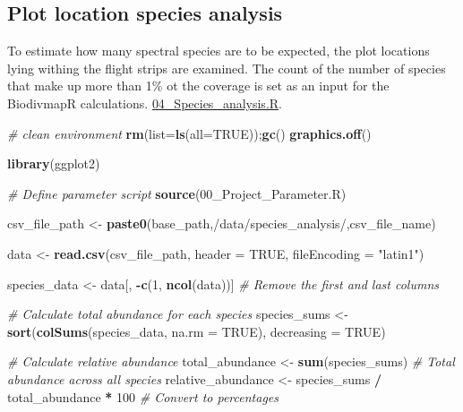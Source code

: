 \documentclass[
]{article}
\newenvironment{Shaded}{\begin{snugshade}}{\end{snugshade}}
\newcommand{\AttributeTok}[1]{\textcolor[rgb]{0.13,0.29,0.53}{#1}}
\newcommand{\CommentTok}[1]{\textcolor[rgb]{0.56,0.35,0.01}{\textit{#1}}}
\newcommand{\ConstantTok}[1]{\textcolor[rgb]{0.56,0.35,0.01}{#1}}
\newcommand{\DecValTok}[1]{\textcolor[rgb]{0.00,0.00,0.81}{#1}}
\newcommand{\FunctionTok}[1]{\textcolor[rgb]{0.13,0.29,0.53}{\textbf{#1}}}
\newcommand{\NormalTok}[1]{#1}
\newcommand{\OtherTok}[1]{\textcolor[rgb]{0.56,0.35,0.01}{#1}}
\newcommand{\SpecialCharTok}[1]{\textcolor[rgb]{0.81,0.36,0.00}{\textbf{#1}}}
\newcommand{\StringTok}[1]{\textcolor[rgb]{0.31,0.60,0.02}{#1}}
\begin{document}
\subsection{Plot location species
analysis}\label{plot-location-species-analysis}

To estimate how many spectral species are to be expected, the plot
locations lying withing the flight strips are examined. The count of the
number of species that make up more than 1\% ot the coverage is set as
an input for the BiodivmapR calculations.
\href{https://github.com/patrickangst/UWW200_Master_Thesis_public/blob/main/MasterThesisRCode/04_Species_analysis.R}{04\_Species\_analysis.R}.

\begin{Shaded}
\begin{Highlighting}[]
\CommentTok{\# clean environment}
\FunctionTok{rm}\NormalTok{(}\AttributeTok{list=}\FunctionTok{ls}\NormalTok{(}\AttributeTok{all=}\ConstantTok{TRUE}\NormalTok{));}\FunctionTok{gc}\NormalTok{()}
\FunctionTok{graphics.off}\NormalTok{()}

\FunctionTok{library}\NormalTok{(ggplot2)}

\CommentTok{\# Define parameter script}
\FunctionTok{source}\NormalTok{(}\StringTok{\textquotesingle{}00\_Project\_Parameter.R\textquotesingle{}}\NormalTok{)}

\NormalTok{csv\_file\_path }\OtherTok{\textless{}{-}} \FunctionTok{paste0}\NormalTok{(base\_path,}\StringTok{\textquotesingle{}/data/species\_analysis/\textquotesingle{}}\NormalTok{,csv\_file\_name)}

\NormalTok{data }\OtherTok{\textless{}{-}} \FunctionTok{read.csv}\NormalTok{(csv\_file\_path, }\AttributeTok{header =} \ConstantTok{TRUE}\NormalTok{, }\AttributeTok{fileEncoding =} \StringTok{"latin1"}\NormalTok{)}

\NormalTok{species\_data }\OtherTok{\textless{}{-}}\NormalTok{ data[, }\SpecialCharTok{{-}}\FunctionTok{c}\NormalTok{(}\DecValTok{1}\NormalTok{, }\FunctionTok{ncol}\NormalTok{(data))]  }\CommentTok{\# Remove the first and last columns}

\CommentTok{\# Calculate total abundance for each species}
\NormalTok{species\_sums }\OtherTok{\textless{}{-}} \FunctionTok{sort}\NormalTok{(}\FunctionTok{colSums}\NormalTok{(species\_data, }\AttributeTok{na.rm =} \ConstantTok{TRUE}\NormalTok{), }\AttributeTok{decreasing =} \ConstantTok{TRUE}\NormalTok{)}

\CommentTok{\# Calculate relative abundance}
\NormalTok{total\_abundance }\OtherTok{\textless{}{-}} \FunctionTok{sum}\NormalTok{(species\_sums)  }\CommentTok{\# Total abundance across all species}
\NormalTok{relative\_abundance }\OtherTok{\textless{}{-}}\NormalTok{ species\_sums }\SpecialCharTok{/}\NormalTok{ total\_abundance }\SpecialCharTok{*} \DecValTok{100}  \CommentTok{\# Convert to percentages}


\end{Highlighting}
\end{Shaded}
\end{document}
